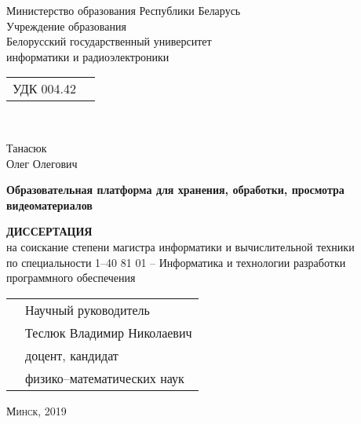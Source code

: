 \begin{titlepage}
  \begin{center}
    Министерство образования Республики Беларусь\\
    Учреждение образования\\
    Белорусский государственный университет\\
    информатики и радиоэлектроники\\

    \bigskip\bigskip\bigskip

    \begin{minipage}{\textwidth}
      \begin{flushleft}
        \begin{tabular}{ l l }
          УДК 004.42
        \end{tabular}
      \end{flushleft}
    \end{minipage}\\[0.5cm]

    \bigskip\bigskip\bigskip

    Танасюк\\
    Олег Олегович\\

    \bigskip\bigskip

    \textbf{Образовательная платформа для хранения, обработки, просмотра видеоматериалов}\\

    \bigskip\bigskip

    \textbf{ДИССЕРТАЦИЯ}\\
    на соискание степени магистра информатики и вычислительной техники\\
    по специальности 1–40 81 01 –  Информатика и технологии разработки\\
    программного обеспечения

    \bigskip\bigskip\bigskip\bigskip\bigskip\bigskip\bigskip

    \begin{tabular}{ l l }
      \hspace*{8cm} & Научный руководитель\\
      & Теслюк Владимир Николаевич\\
      & доцент, кандидат \\
      & физико–математических наук
    \end{tabular}
    \vfill

    \textsc{Минск, 2019}
  \end{center}
\end{titlepage}
